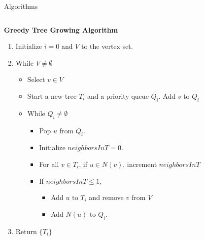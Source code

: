 \documentclass[serif,mathserif,final]{beamer}
\begin{document}
\begin{frame}{}
\begin{columns}[t]
\begin{column}{0.49\linewidth}
\begin{block}{Algorithms}
\begin{columns}[t]
\begin{column}{0.49\linewidth}
\begin{framed}
\noindent\textbf{Greedy Tree Growing Algorithm} %
\begin{enumerate}
\item Initialize $i=0$ and $V$ to the vertex set.
\item While $V\neq\emptyset$
\begin{itemize}
\item Select $v\in V$
\item Start a new tree $T_i$ and a priority queue $Q_i$. Add $v$ to $Q_i$
\item While $Q_i\neq\emptyset$
\begin{itemize}
\item Pop $u$ from $Q_i$.
\item Initialize $neighborsInT=0$.
\item For all $v\in T_i$, if $u\in N(v)$, increment $neighborsInT$
\item If $neighborsInT\le1$,
\begin{itemize}
\item Add $u$ to $T_i$ and remove $v$ from $V$
\item Add $N(u)$ to $Q_i$.
\end{itemize}
\end{itemize}
\end{itemize}
\item Return $\{T_i\}$
\end{enumerate}
\end{framed}

			\end{column}
			\begin{column}{0.49\linewidth}


\end{column}
\end{columns}
\end{block}
\end{column}
\end{columns}
\end{frame}
\end{document}
